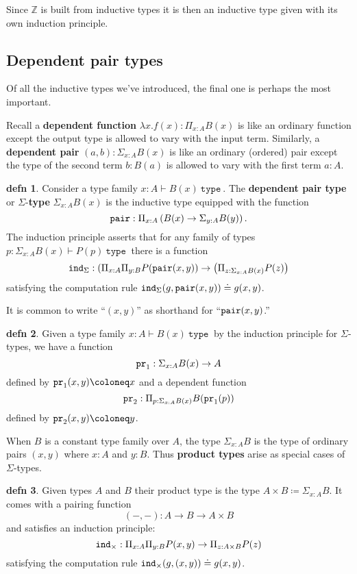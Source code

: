 \documentclass{amsart}
\theoremstyle{theorem}
\theoremstyle{definition}
\newtheorem*{defn}{defn}
\theoremstyle{remark}
\newcommand{\0}{\mathbbe{0}}
\newcommand{\1}{\mathbbe{1}}
\newcommand{\2}{\mathbbe{2}}
\newcommand{\3}{\mathbbe{3}}
\newcommand{\4}{\mathbbe{4}}
\newcommand{\univ}{{~\texttt{type}~}}
\newcommand{\term}[1]{{\textup{\texttt{#1}}}}
\newcommand{\ind}{\term{ind}}
\newcommand{\pair}{\term{pair}}
\newcommand{\pr}{\term{pr}}
\newcommand{\bZ}{{\mathbb{Z}}}
\begin{document}
Since $\bZ$ is built from inductive types it is then an inductive type given with its own induction principle.

\subsection*{Dependent pair types}

Of all the inductive types we've introduced, the final one is perhaps the most important.

Recall a \textbf{dependent function} $\lambda x . f(x) : \Pi_{x : A}B(x)$ is like an ordinary function except the output type is allowed to vary with the input term. Similarly, a \textbf{dependent pair} $(a,b) : \Sigma_{x : A}B(x)$ is like an ordinary (ordered) pair except the type of the second term $b : B(a)$ is allowed to vary with the first term $a :A$.

\begin{defn} Consider a type family $x : A \vdash B(x) \univ$. The \textbf{dependent pair type} or $\Sigma$-\textbf{type} $\Sigma_{x :A}B(x)$ is the inductive type equipped with the function
\[ \pair : \Pi_{x : A} \left(B(x) \to \Sigma_{y : A}B(y)\right).\]
The induction principle asserts that for any family of types $p : \Sigma_{x :A} B(x) \vdash P(p) \univ$ there is a function
\[ \ind_\Sigma : \left( \Pi_{x :A} \Pi_{y : B}P(\pair(x,y) \right) \to \left( \Pi_{z : \Sigma_{x :A}B(x)}P(z) \right)
\]
satisfying the computation rule $\ind_\Sigma (g,\pair(x,y)) \doteq g(x,y)$.
\end{defn}

It is common to write ``$(x,y)$'' as shorthand for ``$\pair(x,y)$.''

\begin{defn} Given a type family $x :A \vdash B(x) \univ$ by the induction principle for $\Sigma$-types, we have a function
\[ \pr_1 : \Sigma_{x :A}B(x) \to A\]
defined by $\pr_1(x,y) \coloneq x$ and a dependent function
\[ \pr_2 :  \Pi_{ p : \Sigma_{x :A}B(x)} B(\pr_1(p))\]
defined by $\pr_2(x,y) \coloneq y$.
\end{defn}

When $B$ is a constant type family over $A$, the type $\Sigma_{x : A}B$ is the type of ordinary pairs $(x,y)$ where $x :A $ and $y: B$. Thus \textbf{product types} arise as special cases of $\Sigma$-types.

\begin{defn} Given types $A$ and $B$ their product type is the type $A \times B \coloneq \Sigma_{x :A}B$. It comes with a pairing function
\[ (-,-) : A \to B \to A \times B\] and satisfies an induction principle:
\[ \ind_\times : \Pi_{x : A} \Pi_{y : B} P(x,y) \to \Pi_{z : A \times B} P(z)\]
satisfying the computation rule $\ind_\times (g,(x,y)) \doteq g(x,y)$.
\end{defn}
\end{document}
